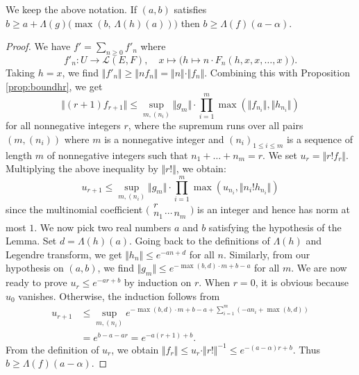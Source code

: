 \documentclass{sig-alternate}
\newcommand{\Z}{\mathbb Z}
\renewcommand{\O}{\mathcal O}
\newcommand{\id}{\textrm{id}}
\def\binom#1#2{\Big(\begin{array}{cc} #1 \\ #2 \end{array}\Big)}
\begin{document}
\begin{lem}
\label{lem:boundLambdaf}
We keep the above notation. 
If $(a,b)$ satisfies
$b \geq a + \Lambda(g)\big( \! \max(b, \, \Lambda(h) (a)) \big)$
then $b \geq \Lambda(f)(a - \alpha)$.
\end{lem}

\begin{proof}
We have $f' = \sum_{n \geq 0} f'_n$ where
$$f'_n : U \to \mathcal L(E,F), \quad
x \mapsto \big(h \mapsto n \cdot F_n(h, x, x, \ldots, x)\big).$$
Taking $h = x$, we find
$\Vert f'_n \Vert \geq \Vert n f_n \Vert = 
\Vert n \Vert \cdot \Vert f_n \Vert$.
Combining this with Proposition \ref{prop:boundhr}, we get
$$\Vert (r+1) f_{r+1} \Vert \leq
  \sup_{m, (n_i)} \Vert g_m \Vert \cdot 
  \prod_{i=1}^m \max(\Vert f_{n_i} \Vert, \Vert h_{n_i} \Vert)$$
for all nonnegative integers $r$,
where the supremum runs over all pairs $(m, (n_i))$ where $m$
is a nonnegative integer and $(n_i)_{1 \leq i \leq m}$ is a sequence of
length $m$ of nonnegative integers such that $n_1 + \ldots + n_m = r$.
We set $u_r = \Vert r! f_r \Vert$. Multiplying the above inequality by
$\Vert r! \Vert$, we obtain:
\begin{equation}
\label{eq:boundurrec}
u_{r+1} \leq
  \sup_{m, (n_i)} \Vert g_m \Vert \cdot 
  \prod_{i=1}^m \max(u_{n_i}, \Vert n_i! h_{n_i} \Vert)
\end{equation}
since the multinomial coefficient $\binom r {\!n_1 \, \cdots \, n_m\!}$
is an integer and hence has norm at most $1$.
We now pick two real numbers $a$ and $b$ satisfying the hypothesis of 
the Lemma. Set $d = \Lambda(h)(a)$. Going back to the definitions of 
$\Lambda (h)$ and Legendre transform, we get $\Vert h_n \Vert \leq e^{- 
a n + d}$ for all $n$.
Similarly, from our hypothesis on $(a,b)$, we find
$\Vert g_m \Vert \leq e^{-\!\max(b,d)\cdot m + b - a}$ for all $m$.
We are now ready to prove $u_r \leq e^{-ar + b}$ by induction on $r$.
When $r = 0$, it is obvious because $u_0$ vanishes. Otherwise, the
induction follows from
\begin{align*}
u_{r+1} 
& \leq \sup_{m, (n_i)}
    e^{ -\max(b,d)\cdot m + b - a + \sum_{i=1}^m (-a n_i + \max(b,d))} \\
& = e^{ b - a - a r } = e^{ -a (r+1) + b}.
\end{align*}
From the definition of $u_r$, we obtain 
$\Vert f_r \Vert \leq u_r \cdot \Vert r! \Vert^{-1} \leq e^{-(a - \alpha) 
r + b}$. Thus $b \geq \Lambda(f)(a - \alpha)$.
\end{proof}

\end{document}
